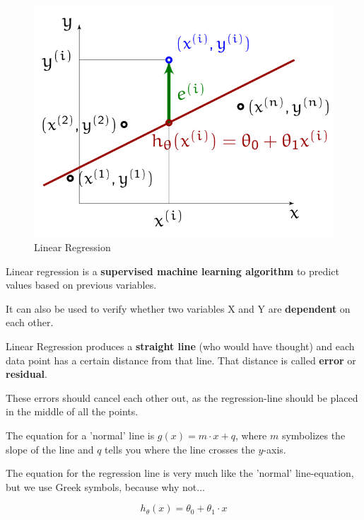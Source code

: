 \documentclass[11pt]{article}
\begin{document}
\begin{figure}
    \centering
    \includegraphics[keepaspectratio=true,height=14\baselineskip]{linear_regression.png}
    \caption{Linear Regression}
    \label{fig:linear_regression}
\end{figure}

Linear regression is a \textbf{supervised machine learning algorithm} to predict values based on previous variables.

It can also be used to verify whether two variables X and Y are \textbf{dependent} on each other.

\vspace{10px}

Linear Regression produces a \textbf{straight line} (who would have thought) and each data point has a certain distance from that line. That distance is called \textbf{error} or \textbf{residual}.

These errors should cancel each other out, as the regression-line should be placed in the middle of all the points.

\vspace{10px}

The equation for a 'normal' line is $g(x) = m \cdot x + q$, where $m$ symbolizes the slope of the line and $q$ tells you where the line crosses the $y$-axis.

The equation for the regression line is very much like the 'normal' line-equation, but we use Greek symbols, because why not...

\begin{equation}
    h_{\theta}(x) = \theta^{}_{0} + \theta^{}_{1} \cdot x
\end{equation}
\end{document}
